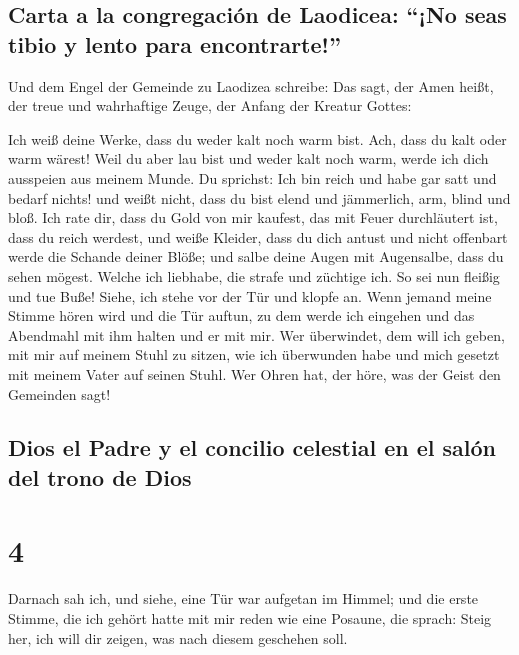 \hypertarget{carta-a-la-congregaciuxf3n-de-laodicea-no-seas-tibio-y-lento-para-encontrarte}{%
\subsection{Carta a la congregación de Laodicea: ``¡No seas tibio y
lento para
encontrarte!''}\label{carta-a-la-congregaciuxf3n-de-laodicea-no-seas-tibio-y-lento-para-encontrarte}}

 Und dem Engel der Gemeinde zu Laodizea schreibe: Das
sagt, der Amen heißt, der treue und wahrhaftige Zeuge, der Anfang der
Kreatur Gottes:

 Ich weiß deine Werke, dass du weder kalt noch warm bist.
Ach, dass du kalt oder warm wärest!  Weil du aber lau
bist und weder kalt noch warm, werde ich dich ausspeien aus meinem
Munde.  Du sprichst: Ich bin reich und habe gar satt und
bedarf nichts! und weißt nicht, dass du bist elend und jämmerlich, arm,
blind und bloß.  Ich rate dir, dass du Gold von mir
kaufest, das mit Feuer durchläutert ist, dass du reich werdest, und
weiße Kleider, dass du dich antust und nicht offenbart werde die Schande
deiner Blöße; und salbe deine Augen mit Augensalbe, dass du sehen
mögest.  Welche ich liebhabe, die strafe und züchtige
ich. So sei nun fleißig und tue Buße!  Siehe, ich stehe
vor der Tür und klopfe an. Wenn jemand meine Stimme hören wird und die
Tür auftun, zu dem werde ich eingehen und das Abendmahl mit ihm halten
und er mit mir.  Wer überwindet, dem will ich geben, mit
mir auf meinem Stuhl zu sitzen, wie ich überwunden habe und mich gesetzt
mit meinem Vater auf seinen Stuhl.  Wer Ohren hat, der
höre, was der Geist den Gemeinden sagt!

\hypertarget{dios-el-padre-y-el-concilio-celestial-en-el-saluxf3n-del-trono-de-dios}{%
\subsection{Dios el Padre y el concilio celestial en el salón del trono
de
Dios}\label{dios-el-padre-y-el-concilio-celestial-en-el-saluxf3n-del-trono-de-dios}}

\hypertarget{section-3}{%
\section{4}\label{section-3}}

 Darnach sah ich, und siehe, eine Tür war aufgetan im
Himmel; und die erste Stimme, die ich gehört hatte mit mir reden wie
eine Posaune, die sprach: Steig her, ich will dir zeigen, was nach
diesem geschehen soll.

